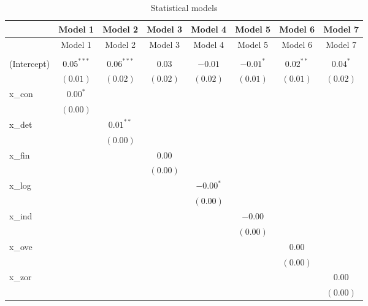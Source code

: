 
\begin{center}
\begin{longtable}{l c c c c c c c }
\hline
 & Model 1 & Model 2 & Model 3 & Model 4 & Model 5 & Model 6 & Model 7 \\
\hline
\endfirsthead
\hline
 & Model 1 & Model 2 & Model 3 & Model 4 & Model 5 & Model 6 & Model 7 \\
\hline
\endhead
\hline
\endfoot
\hline
\multicolumn{8}{l}{\scriptsize{$^{***}p<0.001$, $^{**}p<0.01$, $^*p<0.05$}}\\
\caption{Statistical models}
\label{table:coefficients}
\endlastfoot
(Intercept) & $0.05^{***}$ & $0.06^{***}$ & $0.03$   & $-0.01$     & $-0.01^{*}$ & $0.02^{**}$ & $0.04^{*}$ \\
            & $(0.01)$     & $(0.02)$     & $(0.02)$ & $(0.02)$    & $(0.01)$    & $(0.01)$    & $(0.02)$   \\
x\_con      & $0.00^{*}$   &              &          &             &             &             &            \\
            & $(0.00)$     &              &          &             &             &             &            \\
x\_det      &              & $0.01^{**}$  &          &             &             &             &            \\
            &              & $(0.00)$     &          &             &             &             &            \\
x\_fin      &              &              & $0.00$   &             &             &             &            \\
            &              &              & $(0.00)$ &             &             &             &            \\
x\_log      &              &              &          & $-0.00^{*}$ &             &             &            \\
            &              &              &          & $(0.00)$    &             &             &            \\
x\_ind      &              &              &          &             & $-0.00$     &             &            \\
            &              &              &          &             & $(0.00)$    &             &            \\
x\_ove      &              &              &          &             &             & $0.00$      &            \\
            &              &              &          &             &             & $(0.00)$    &            \\
x\_zor      &              &              &          &             &             &             & $0.00$     \\
            &              &              &          &             &             &             & $(0.00)$   \\
\end{longtable}
\end{center}
